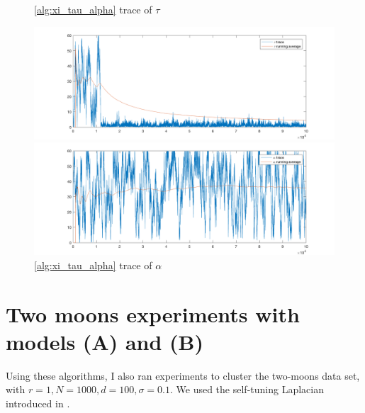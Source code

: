 \documentclass{siamart1116}
\begin{document}
    \begin{figure}[!htb]
    \begin{minipage}{0.48\textwidth}
        \caption{\label{fig:noncentered_voting_tau}\cref{alg:xi_tau_alpha} trace of $\tau$}
        \includegraphics[width=\linewidth]{voting/noncentered/trace_tau.png}
    \end{minipage}\hfill
    \begin{minipage}{0.48\textwidth}
        \caption{\label{fig:noncentered_voting_alpha} \cref{alg:xi_tau_alpha} trace of $\alpha$}
        \includegraphics[width=\linewidth]{voting/noncentered/trace_alpha.png}
    \end{minipage}
    \end{figure}

\section{Two moons experiments with models (A) and (B)}
    Using these algorithms, I also ran experiments to cluster the two-moons data set, with $r=1, N = 1000, d = 100, \sigma = 0.1$. We used the self-tuning Laplacian introduced in \cite{SelfTuning}.
\end{document}
